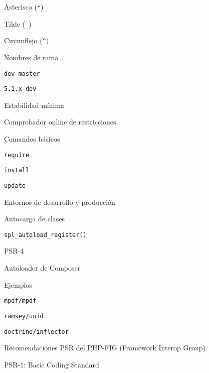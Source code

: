 \begin{longenum}
\begin{longenum}
\begin{longenum}
\begin{longenum}
                \item Asterisco (\texttt{*})
                \item Tilde (\texttt{~})
                \item Circunflejo (\texttt{\^})
                \item Nombres de rama
                \begin{longenum}
                    \item \texttt{dev-master}
                    \item \texttt{5.1.x-dev}
                \end{longenum}
                \item Estabilidad mínima
                \item Comprobador online de restricciones
            \end{longenum}
            \item Comandos básicos
            \begin{longenum}
                \item \texttt{require}
                \item \texttt{install}
                \item \texttt{update}
            \end{longenum}
            \item Entornos de desarrollo y producción
        \end{longenum}
        \item Autocarga de clases
        \begin{longenum}
            \item \texttt{spl\_autoload\_register()}
            \item PSR-4
            \item Autoloader de Composer
        \end{longenum}
        \item Ejemplos
        \begin{longenum}
            \item \texttt{mpdf/mpdf}
            \item \texttt{ramsey/uuid}
            \item \texttt{doctrine/inflector}
        \end{longenum}
        \item Recomendaciones PSR del PHP-FIG (Framework Interop Group)
        \begin{longenum}
            \item PSR-1: Basic Coding Standard

\end{longenum}
\end{longenum}
\end{longenum}
